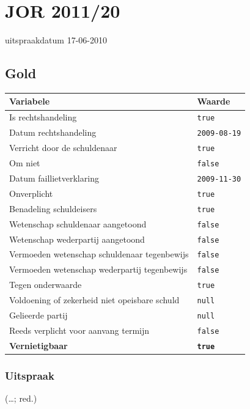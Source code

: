 \documentclass[
  dutch,
  a4paper,
]{article}
\begin{document}
\section{JOR 2011/20}\label{jor-201120}

uitspraakdatum 17-06-2010

\subsection{Gold}\label{gold-7}

\begin{center}
\small
\begin{tabular}{@{}p{8cm}p{2.6cm}@{}}
\toprule
Variabele & Waarde \\
\midrule
Is rechtshandeling & \texttt{true} \\
Datum rechtshandeling & \texttt{2009-08-19} \\
Verricht door de schuldenaar & \texttt{true} \\
Om niet & \texttt{false} \\
Datum faillietverklaring & \texttt{2009-11-30} \\
Onverplicht & \texttt{true} \\
Benadeling schuldeisers & \texttt{true} \\
Wetenschap schuldenaar aangetoond & \texttt{false} \\
Wetenschap wederpartij aangetoond & \texttt{false} \\
Vermoeden wetenschap schuldenaar tegenbewijs & \texttt{false} \\
Vermoeden wetenschap wederpartij tegenbewijs & \texttt{false} \\
Tegen onderwaarde & \texttt{true} \\
Voldoening of zekerheid niet opeisbare schuld & \texttt{null} \\
Gelieerde partij & \texttt{null} \\
Reeds verplicht voor aanvang termijn & \texttt{false} \\
\textbf{Vernietigbaar} & \textbf{\texttt{true}} \\
\bottomrule
\end{tabular}
\end{center}

\subsubsection{Uitspraak}\label{uitspraak-7}

(\ldots; red.)
\end{document}
